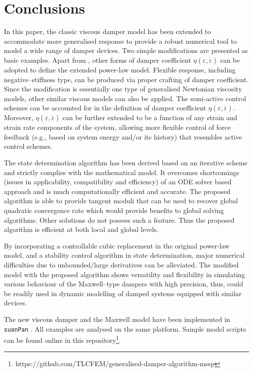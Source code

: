 \section{Conclusions}
In this paper, the classic viscous damper model has been extended to accommodate more generalised response to provide a robust numerical tool to model a wide range of damper devices. Two simple modifications are presented as basic examples. Apart from , other forms of damper coefficient $\eta\left(\varepsilon,\dot{\varepsilon}\right)$ can be adopted to define the extended power-law model. Flexible response, including negative--stiffness type, can be produced via proper crafting of damper coefficient. Since the modification is essentially one type of generalised Newtonian viscosity models, other similar viscous models can also be applied. The semi-active control schemes can be accounted for in the definition of damper coefficient $\eta\left(\varepsilon,\dot{\varepsilon}\right)$. Moreover, $\eta\left(\varepsilon,\dot{\varepsilon}\right)$ can be further extended to be a function of any strain and strain rate components of the system, allowing more flexible control of force feedback (e.g., based on system energy and/or its history) that resembles active control schemes.

The state determination algorithm has been derived based on an iterative scheme and strictly complies with the mathematical model. It overcomes shortcomings (issues in applicability, compatibility and efficiency) of an ODE solver based approach and is much computationally efficient and accurate. The proposed algorithm is able to provide tangent moduli that can be used to recover global quadratic convergence rate which would provide benefits to global solving algorithms. Other solutions do not possess such a feature. Thus the proposed algorithm is efficient at both local and global levels.

By incorporating a controllable cubic replacement in the original power-law model, and a stability control algorithm in state determination, major numerical difficulties due to unbounded/large derivatives can be alleviated. The modified model with the proposed algorithm shows versatility and flexibility in simulating various behaviour of the Maxwell--type dampers with high precision, thus, could be readily used in dynamic modelling of damped systems equipped with similar devices.

The new viscous damper and the Maxwell model have been implemented in \texttt{suanPan} \citep{Chang2018}. All examples are analysed on the same platform. Sample model scripts can be found online in this repository\footnote{https://github.com/TLCFEM/generalised-damper-algorithm-mssp}.
